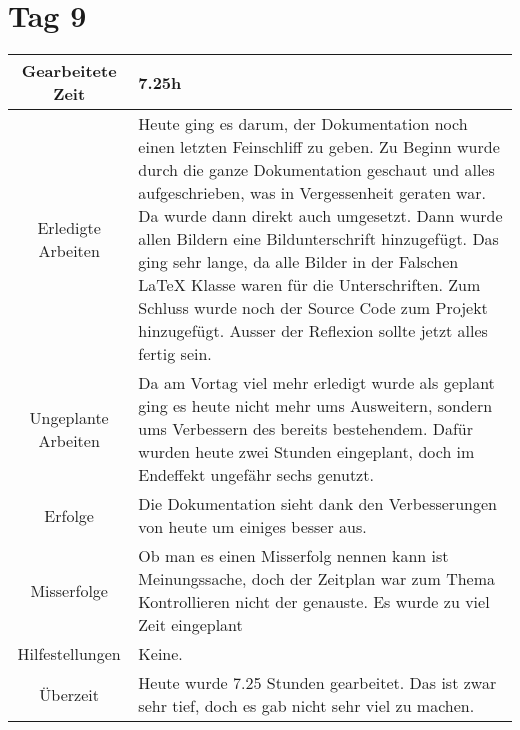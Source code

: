 \section{Tag 9}
\begin{tabularx}{\textwidth}[H]{|c|X|}
  \hline
  Gearbeitete Zeit & 7.25h \\ \hline
  Erledigte Arbeiten & Heute ging es darum, der Dokumentation noch einen letzten Feinschliff zu geben. Zu Beginn wurde
  durch die ganze Dokumentation geschaut und alles aufgeschrieben, was in Vergessenheit geraten war. Da wurde dann
  direkt auch umgesetzt. \newline
  Dann wurde allen Bildern eine Bildunterschrift hinzugefügt. Das ging sehr lange, da alle Bilder in der Falschen
  LaTeX Klasse waren für die Unterschriften. \newline
  Zum Schluss wurde noch der Source Code zum Projekt hinzugefügt. Ausser der Reflexion sollte jetzt alles fertig
  sein. \\ \hline
  Ungeplante Arbeiten & Da am Vortag viel mehr erledigt wurde als geplant ging es heute nicht mehr ums Ausweitern,
  sondern ums Verbessern des bereits bestehendem. Dafür wurden heute zwei Stunden eingeplant, doch im Endeffekt
  ungefähr sechs genutzt. \\ \hline
  Erfolge & Die Dokumentation sieht dank den Verbesserungen von heute um einiges besser aus. \\ \hline
  Misserfolge & Ob man es einen Misserfolg nennen kann ist Meinungssache, doch der Zeitplan war zum Thema Kontrollieren
  nicht der genauste. Es wurde zu viel Zeit eingeplant \\ \hline
  Hilfestellungen & Keine. \\ \hline
  Überzeit & Heute wurde 7.25 Stunden gearbeitet. Das ist zwar sehr tief, doch es gab nicht sehr viel zu machen. \\ \hline
\end{tabularx}

\newpage

